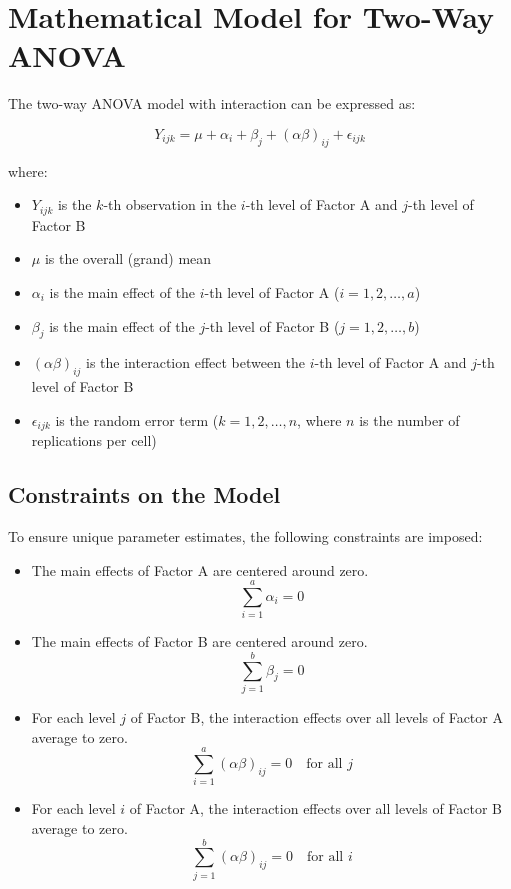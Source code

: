 \documentclass[twoside]{book}
\begin{document}
\section{Mathematical Model for Two-Way ANOVA}

The two-way ANOVA model with interaction can be expressed as:

\begin{textbox}
\begin{equation*}
Y_{ijk} = \mu + \alpha_i + \beta_j + (\alpha\beta)_{ij} + \epsilon_{ijk}
\end{equation*}
\end{textbox}

where:
\begin{itemize}
\item $Y_{ijk}$ is the $k$-th observation in the $i$-th level of Factor A and $j$-th level of Factor B
\item $\mu$ is the overall (grand) mean
\item $\alpha_i$ is the main effect of the $i$-th level of Factor A ($i = 1, 2, \ldots, a$)
\item $\beta_j$ is the main effect of the $j$-th level of Factor B ($j = 1, 2, \ldots, b$)
\item $(\alpha\beta)_{ij}$ is the interaction effect between the $i$-th level of Factor A and $j$-th level of Factor B
\item $\epsilon_{ijk}$ is the random error term ($k = 1, 2, \ldots, n$, where $n$ is the number of replications per cell)
\end{itemize}

\subsection{Constraints on the Model}

To ensure unique parameter estimates, the following constraints are imposed:
\begin{itemize}
\item The main effects of Factor A are centered around zero.
$$ \sum_{i=1}^a \alpha_i = 0 $$

\item The main effects of Factor B are centered around zero. $$ \sum_{j=1}^b \beta_j = 0 $$

\item For each level $j$ of Factor B, the interaction effects over all levels of Factor A average to zero.
$$ \sum_{i=1}^a (\alpha\beta)_{ij} = 0 \quad \text{for all } j $$

\item For each level $i$ of Factor A, the interaction effects over all levels of Factor B average to zero.
$$ \displaystyle \sum_{j=1}^b (\alpha\beta)_{ij} = 0 \quad \text{for all } i $$

\end{itemize}
\end{document}
